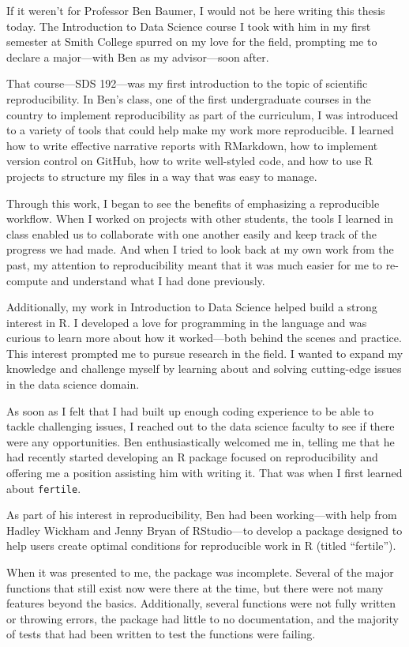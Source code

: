 \documentclass[12pt,twoside]{reedthesis}
\begin{document}
If it weren't for Professor Ben Baumer, I would not be here writing this thesis today. The Introduction to Data Science course I took with him in my first semester at Smith College spurred on my love for the field, prompting me to declare a major---with Ben as my advisor---soon after.

That course---SDS 192---was my first introduction to the topic of scientific reproducibility. In Ben's class, one of the first undergraduate courses in the country to implement reproducibility as part of the curriculum, I was introduced to a variety of tools that could help make my work more reproducible. I learned how to write effective narrative reports with RMarkdown, how to implement version control on GitHub, how to write well-styled code, and how to use R projects to structure my files in a way that was easy to manage.

Through this work, I began to see the benefits of emphasizing a reproducible workflow. When I worked on projects with other students, the tools I learned in class enabled us to collaborate with one another easily and keep track of the progress we had made. And when I tried to look back at my own work from the past, my attention to reproducibility meant that it was much easier for me to re-compute and understand what I had done previously.

Additionally, my work in Introduction to Data Science helped build a strong interest in R. I developed a love for programming in the language and was curious to learn more about how it worked---both behind the scenes and practice. This interest prompted me to pursue research in the field. I wanted to expand my knowledge and challenge myself by learning about and solving cutting-edge issues in the data science domain.

As soon as I felt that I had built up enough coding experience to be able to tackle challenging issues, I reached out to the data science faculty to see if there were any opportunities. Ben enthusiastically welcomed me in, telling me that he had recently started developing an R package focused on reproducibility and offering me a position assisting him with writing it. That was when I first learned about \texttt{fertile}.

As part of his interest in reproducibility, Ben had been working---with help from Hadley Wickham and Jenny Bryan of RStudio---to develop a package designed to help users create optimal conditions for reproducible work in R (titled ``fertile'').

When it was presented to me, the package was incomplete. Several of the major functions that still exist now were there at the time, but there were not many features beyond the basics. Additionally, several functions were not fully written or throwing errors, the package had little to no documentation, and the majority of tests that had been written to test the functions were failing.
\end{document}
